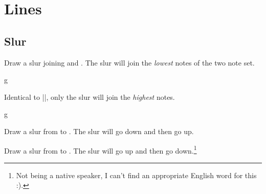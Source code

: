 \section{Lines}\label{sec:line}
\subsection{Slur}\label{sec:line:slur}
\begin{command}{\tmslur{}}
  Draw a slur joining  and . The slur will join the 
  \emph{lowest} notes of the two note set.
\end{command}
\begin{codeexample}[]
\begin{tmline}
\begin{tmstaff}{g}{}
\end{tmstaff}
\end{tmline}
\end{codeexample}
\begin{command}{\tmslur*{}}
  Identical to |\tmslur|, only the slur will join the \emph{highest} notes.
\end{command}
\begin{codeexample}[]
\begin{tmline}
  \begin{tmstaff}{g}{}
  \end{tmstaff}
\end{tmline}
\end{codeexample}
\begin{command}{\tmslurline{}}
  Draw a slur from  to . The slur will go 
  down and then go up.
\end{command}
\begin{command}{\tmslurline*{}}
  Draw a slur from  to . The slur will go 
  up and then go down.\footnote{Not being a native speaker, I can't find an 
  appropriate English word for this :).}
\end{command}
